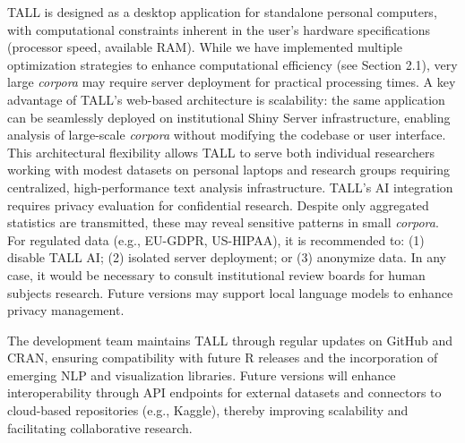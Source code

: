\documentclass[preprint,12pt,a4paper]{elsarticle}
\begin{document}
TALL is designed as a desktop application for standalone personal computers, with computational constraints inherent in the user's hardware specifications (processor speed, available RAM). While we have implemented multiple optimization strategies to enhance computational efficiency (see Section 2.1), very large \textit{corpora} may require server deployment for practical processing times. A key advantage of TALL's web-based architecture is scalability: the same application can be seamlessly deployed on institutional Shiny Server infrastructure, enabling analysis of large-scale \textit{corpora} without modifying the codebase or user interface. This architectural flexibility allows TALL to serve both individual researchers working with modest datasets on personal laptops and research groups requiring centralized, high-performance text analysis infrastructure. TALL's AI integration requires privacy evaluation for confidential research. Despite only aggregated statistics are transmitted, these may reveal sensitive patterns in small \textit{corpora}. For regulated data (e.g., EU-GDPR, US-HIPAA), it is recommended to: (1) disable TALL AI; (2) isolated server deployment; or (3) anonymize data. In any case, it would be necessary to consult institutional review boards for human subjects research. Future versions may support local language models to enhance privacy management.

The development team maintains TALL through regular updates on GitHub and CRAN, ensuring compatibility with future \textsf{R} releases and the incorporation of emerging NLP and visualization libraries. Future versions will enhance interoperability through API endpoints for external datasets and connectors to cloud-based repositories (e.g., Kaggle), thereby improving scalability and facilitating collaborative research.

\end{document}
